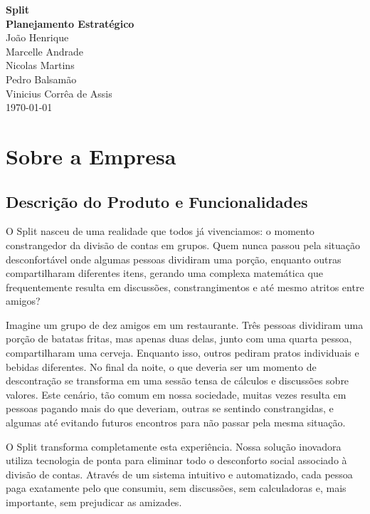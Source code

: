 \documentclass[12pt,a4paper]{article}
\begin{document}
\begin{titlepage}
    \begin{center}
        \vspace*{3cm}
        {\Large\textbf{Split}}\\[0.5cm]
        {\large\textbf{Planejamento Estratégico}}\\[7cm]
        
        João Henrique\\
        Marcelle Andrade\\
        Nicolas Martins \\ 
        Pedro Balsamão\\
        Vinicius Corrêa de Assis\\[4cm]
        
        \today
    \end{center}
\end{titlepage}

\tableofcontents
\newpage

\section{Sobre a Empresa}

\subsection{Descrição do Produto e Funcionalidades}
O Split nasceu de uma realidade que todos já vivenciamos: o momento constrangedor da divisão de contas em grupos. Quem nunca passou pela situação desconfortável onde algumas pessoas dividiram uma porção, enquanto outras compartilharam diferentes itens, gerando uma complexa matemática que frequentemente resulta em discussões, constrangimentos e até mesmo atritos entre amigos?

Imagine um grupo de dez amigos em um restaurante. Três pessoas dividiram uma porção de batatas fritas, mas apenas duas delas, junto com uma quarta pessoa, compartilharam uma cerveja. Enquanto isso, outros pediram pratos individuais e bebidas diferentes. No final da noite, o que deveria ser um momento de descontração se transforma em uma sessão tensa de cálculos e discussões sobre valores. Este cenário, tão comum em nossa sociedade, muitas vezes resulta em pessoas pagando mais do que deveriam, outras se sentindo constrangidas, e algumas até evitando futuros encontros para não passar pela mesma situação.

O Split transforma completamente esta experiência. Nossa solução inovadora utiliza tecnologia de ponta para eliminar todo o desconforto social associado à divisão de contas. Através de um sistema intuitivo e automatizado, cada pessoa paga exatamente pelo que consumiu, sem discussões, sem calculadoras e, mais importante, sem prejudicar as amizades.
\end{document}

